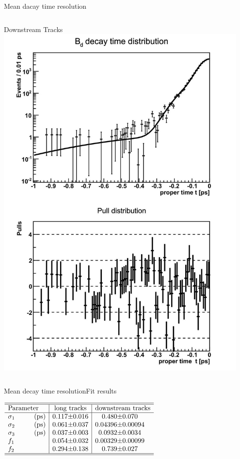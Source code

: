 \documentclass{beamer}
\begin{document}
\begin{frame}{Mean dacay time resolution}
\begin{columns}
\begin{block}{Downstream Tracks}
	\includegraphics[width=0.95\textwidth]{resolution_ds}
	\end{block}
	\end{columns}
	\end{frame}

    \begin{frame}{Mean decay time resolution}{Fit results}
    \begin{center}
    $\begin{array}{l | r@{\pm}l | r@{\pm}l}
\hline 
\hline
\text{Parameter} & \multicolumn{2}{c|}{\text{long tracks}} & \multicolumn{2}{c}{\text{downstream tracks}}\\
\hline
\sigma_{1}\hspace{1cm}(\text{ps}) &	0.117 & 0.016 & 0.480 & 0.070\\
\sigma_{2}\hspace{1cm}(\text{ps}) &	0.061 & 0.037 & 0.04396 & 0.00094\\
\sigma_{3}\hspace{1cm}(\text{ps}) &0.037 &	0.003 & 0.0932 & 0.0034 \\
f_{1} &0.054 & 0.032 & 0.00329 & 0.00099\\
f_{2} &0.294 & 0.138 & 0.739 & 0.027\\ \hline \hline
\end{array}$   
    \end{center}
    \end{frame}        	
	
\end{document}
